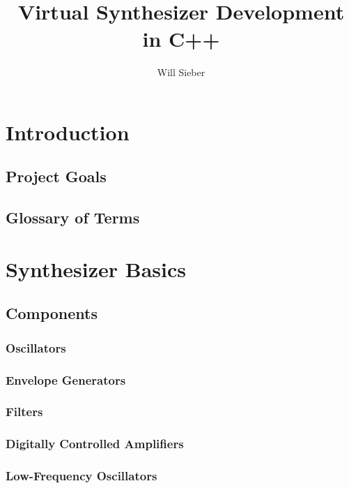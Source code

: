 \documentclass[12pt]{article}
\title{Virtual Synthesizer Development in C++}
\date{\vspace{-5ex}}
\author{Will Sieber}
\begin{document}
\maketitle

\tableofcontents
\newpage


\section{Introduction}

\subsection{Project Goals}

\subsection{Glossary of Terms}

\section{Synthesizer Basics}

\subsection{Components}

\subsubsection{Oscillators}

\subsubsection{Envelope Generators}

\subsubsection{Filters}

\subsubsection{Digitally Controlled Amplifiers}

\subsubsection{Low-Frequency Oscillators}
\end{document}
